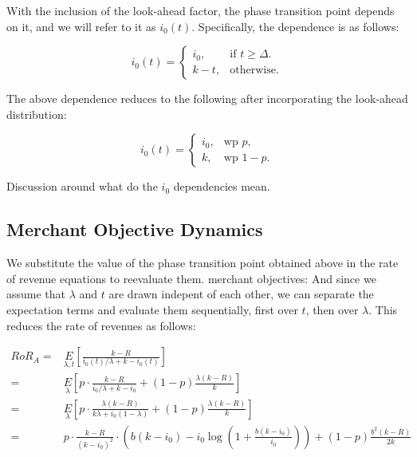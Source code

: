 With the inclusion of the look-ahead factor, the phase transition point depends on it, and we will refer to it as $i_0(t)$. Specifically, the dependence is as follows:

\begin{equation*}
  i_0(t)=\begin{cases}
    i_0, & \text{if $t \geq \Delta$}.\\
    k-t, & \text{otherwise}.
  \end{cases}
\end{equation*}

The above dependence reduces to the following after incorporating the look-ahead distribution:

\begin{equation*}
  i_0(t)=\begin{cases}
    i_0, & \text{wp } p,\\
    k, & \text{wp } 1-p.
  \end{cases}
\end{equation*}

{\arpit Discussion around what do the $i_0$ dependencies mean.}

\subsection{Merchant Objective Dynamics}
We substitute the value of the phase transition point obtained above in the rate of revenue equations to reevaluate them. merchant objectives:
And since we assume that $\lambda$ and $t$ are drawn indepent of each other, we can separate the expectation terms and evaluate them sequentially, first over $t$, then over $\lambda$. This reduces the rate of revenues as follows:

\begin{align*}
RoR_A =& \underset{\lambda, t}E\left[\frac{k-R}{i_0(t)/\lambda + k - i_0(t)}\right]\\
                                       =& \underset{\lambda}E\left[p\cdot\frac{k-R}{i_0/\lambda + k - i_0} + (1-p)\frac{\lambda(k-R)}{k}\right]\\
                                       =& \underset{\lambda}E\left[p\cdot\frac{\lambda(k-R)}{k\lambda + i_0(1-\lambda)} + (1-p)\frac{\lambda(k-R)}{k}\right]\\
                                       =& p\cdot\frac{k-R}{(k-i_0)^2}\cdot\left(b(k-i_0) - i_0 \log\left(1 + \frac{b(k-i_0)}{i_0}\right)\right) + (1-p)\frac{b^2(k-R)}{2k}
\end{align*}

